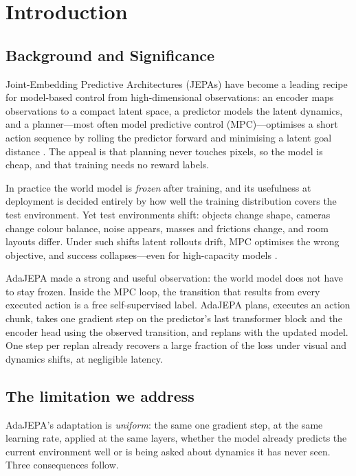 \section{Introduction}

\subsection{Background and Significance}

Joint-Embedding Predictive Architectures (JEPAs) have become a leading recipe for
model-based control from high-dimensional observations: an encoder maps observations to a
compact latent space, a predictor models the latent dynamics, and a planner---most often
model predictive control (MPC)---optimises a short action sequence by rolling the predictor
forward and minimising a latent goal distance \cite{lecun-2022-path,zhou-2025-dinowm,
sobal-2025-offline,wang-2026-temporal,assran-2025-vjepa2}. The appeal is that planning never
touches pixels, so the model is cheap, and that training needs no reward labels.

In practice the world model is \emph{frozen} after training, and its usefulness at deployment
is decided entirely by how well the training distribution covers the test environment. Yet
test environments shift: objects change shape, cameras change colour balance, noise appears,
masses and frictions change, and room layouts differ. Under such shifts latent rollouts
drift, MPC optimises the wrong objective, and success collapses---even for high-capacity
models \cite{zhou-2025-dinowm,toso-2026-invariant,zhang-2026-hierarchical}.

AdaJEPA \cite{wang-2026-adajepa} made a strong and useful observation: the world model does
not have to stay frozen. Inside the MPC loop, the transition that results from every executed
action is a free self-supervised label. AdaJEPA plans, executes an action chunk, takes one
gradient step on the predictor's last transformer block and the encoder head using the
observed transition, and replans with the updated model. One step per replan already recovers
a large fraction of the loss under visual and dynamics shifts, at negligible latency.

\subsection{The limitation we address}

AdaJEPA's adaptation is \emph{uniform}: the same one gradient step, at the same learning
rate, applied at the same layers, whether the model already predicts the current environment
well or is being asked about dynamics it has never seen. Three consequences follow.

